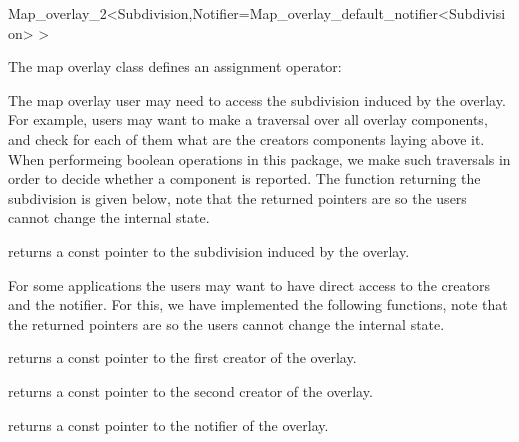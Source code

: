 \begin{ccRefClass}{Map_overlay_2<Subdivision,Notifier=Map_overlay_default_notifier<Subdivision> >}
\begin{ccAdvanced}




\end{ccAdvanced}

The map overlay class defines an assignment operator:



The map overlay user may need to access the subdivision induced by the overlay. 
For example, users may want to make a traversal over all overlay 
components, and check for each of them what are the creators 
components laying above it. 
When performeing boolean operations in this package,
we make such traversals in order to decide whether a component 
is reported.
The function returning the subdivision is given below, 
note that the returned pointers are  so
the users cannot change the internal state.

    {returns a const pointer to the subdivision induced by the overlay.}

\begin{ccAdvanced}
    For some applications the users may want to have direct access to
    the creators and the notifier. For this, we have implemented the 
    following functions, note that the returned pointers are  so
    the users cannot change the internal state.

    {returns a const pointer to the first creator of the overlay.}

    {returns a const pointer to the second creator of the overlay.}

    {returns a const pointer to the notifier of the overlay.}
    
\end{ccAdvanced}

\ccSeeAlso
{}\\

\end{ccRefClass}

\ccRefPageEnd
